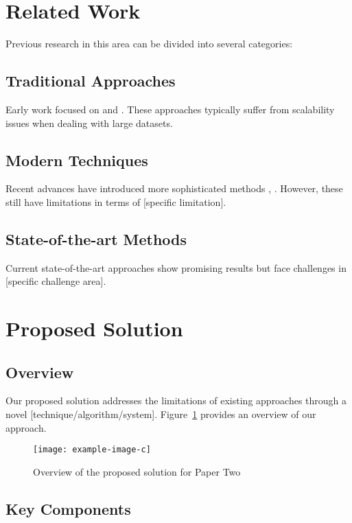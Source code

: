\section{Related Work}

Previous research in this area can be divided into several categories:

\subsection{Traditional Approaches}
Early work focused on \cite{example-reference-4} and \cite{example-reference-5}. These approaches typically suffer from scalability issues when dealing with large datasets.

\subsection{Modern Techniques}
Recent advances have introduced more sophisticated methods \cite{example-reference-6}, \cite{example-reference-7}. However, these still have limitations in terms of [specific limitation].

\subsection{State-of-the-art Methods}
Current state-of-the-art approaches \cite{example-reference-8} show promising results but face challenges in [specific challenge area].

\section{Proposed Solution}

\subsection{Overview}

Our proposed solution addresses the limitations of existing approaches through a novel [technique/algorithm/system]. Figure~\ref{fig:papertwo-overview} provides an overview of our approach.

\begin{figure}[!htb]
    \centering
    \texttt{[image: example-image-c]}
    \caption{Overview of the proposed solution for Paper Two}
    \label{fig:papertwo-overview}
\end{figure}

\subsection{Key Components}

